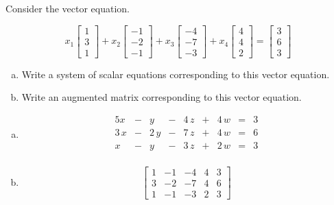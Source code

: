 
\begin{exerciseStatement}


Consider the vector equation.

\[ x_{1} \left[\begin{array}{c}
1 \\
3 \\
1
\end{array}\right] + x_{2} \left[\begin{array}{c}
-1 \\
-2 \\
-1
\end{array}\right] + x_{3} \left[\begin{array}{c}
-4 \\
-7 \\
-3
\end{array}\right] + x_{4} \left[\begin{array}{c}
4 \\
4 \\
2
\end{array}\right] = \left[\begin{array}{c}
3 \\
6 \\
3
\end{array}\right] \]
\begin{enumerate}[(a)]
\item  Write a system of scalar equations corresponding to this vector equation. 
\item  Write an augmented matrix corresponding to this vector equation. 
\end{enumerate}
    
\end{exerciseStatement}
    
\begin{exerciseAnswer} 

\begin{enumerate}[(a)]
\item 
\begin{alignat*}{5} x &-& y &-& 4 \, z &+& 4 \, {w} &=& 3 \\3 \, x &-& 2 \, y &-& 7 \, z &+& 4 \, {w} &=& 6 \\x &-& y &-& 3 \, z &+& 2 \, {w} &=& 3 \\ \end{alignat*}
            
\item \[ \left[\begin{array}{cccc|c}
1 & -1 & -4 & 4 & 3 \\
3 & -2 & -7 & 4 & 6 \\
1 & -1 & -3 & 2 & 3
\end{array}\right] \]
\end{enumerate}
    
\end{exerciseAnswer}
    
